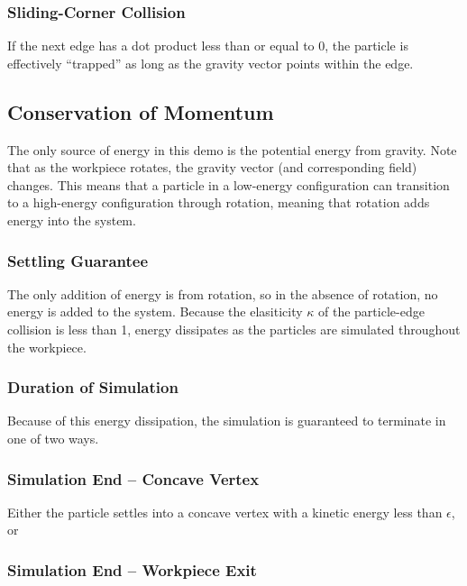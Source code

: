 		\subsubsection{Sliding-Corner Collision}

		If the next edge has a dot product less than or equal to 0, the particle is effectively ``trapped'' as long as the gravity vector points within the edge.


	\subsection{Conservation of Momentum}

		The only source of energy in this demo is the potential energy from gravity. Note that as the workpiece rotates, the gravity vector (and corresponding field) changes. This means that a particle in a low-energy configuration can transition to a high-energy configuration through rotation, meaning that rotation adds energy into the system.

		\subsubsection{Settling Guarantee}

		The only addition of energy is from rotation, so in the absence of rotation, no energy is added to the system. Because the elasiticity $\kappa$ of the particle-edge collision is less than 1, energy dissipates as the particles are simulated throughout the workpiece.

		\subsubsection{Duration of Simulation}

		Because of this energy dissipation, the simulation is guaranteed to terminate in one of two ways.

		\subsubsection{Simulation End -- Concave Vertex}

		Either the particle settles into a concave vertex with a kinetic energy less than $\epsilon$, or

		\subsubsection{Simulation End -- Workpiece Exit}

